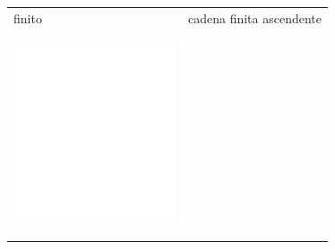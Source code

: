 \documentclass[11pt]{article}
\begin{document}
\begin{center}
\begin{tabular}{ll}
finito & cadena finita ascendente\\
\begin{center}
\includegraphics[width=.9\linewidth]{finito2.png}
\end{center} & \begin{center}

\end{center}
\end{tabular}
\end{center}
\end{document}
